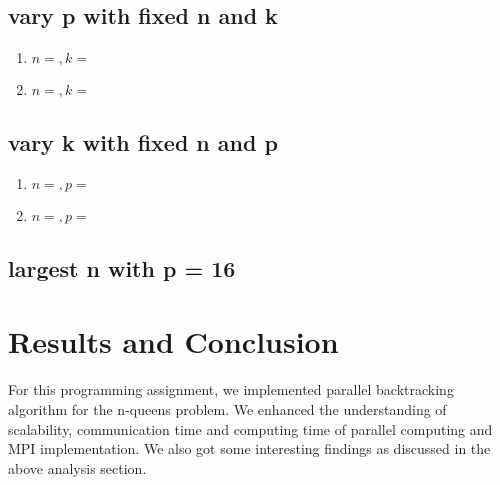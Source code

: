 \documentclass[twoside,12pt]{article}
\begin{document}
\subsection{vary p with fixed n and k}
\begin{enumerate}
	\item $ n = , k =  $ \\
	
	\item  $ n =  , k =  $ \\
\end{enumerate}

\subsection{vary k with fixed n and p}
\begin{enumerate}
	\item $ n = , p =  $ \\
	
	\item  $ n =  , p =  $ \\
\end{enumerate}

\subsection{largest n with  p = 16 }



\section{Results and Conclusion}
For this programming assignment, we implemented parallel backtracking algorithm for the n-queens problem. We enhanced the understanding of scalability, communication time and computing time of parallel computing and MPI implementation. We also got some interesting findings as discussed in the above analysis section. 

     
\end{document}
